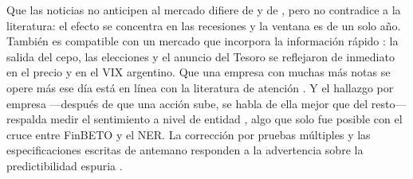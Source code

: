 Que las noticias no anticipen al mercado difiere de \citet{tetlock2007} y de \citet{galdi2018},
pero no contradice a la literatura: el efecto se concentra en las recesiones \citep{garcia2013} y
la ventana es de un solo año. También es compatible con un mercado que incorpora la información
rápido \citep{fama1970}: la salida del cepo, las elecciones y el anuncio del Tesoro se reflejaron
de inmediato en el precio y en el VIX argentino. Que una empresa con muchas más notas se opere más
ese día está en línea con la literatura de atención \citep{da2011,engelberg2011}. Y el hallazgo por
empresa —después de que una acción sube, se habla de ella mejor que del resto— respalda medir el
sentimiento a nivel de entidad \citep{tang2023finentity}, algo que solo fue posible con el cruce
entre FinBETO y el NER. La corrección por pruebas múltiples y las especificaciones escritas de
antemano responden a la advertencia sobre la predictibilidad espuria \citep{nikolopoulos2026}.
